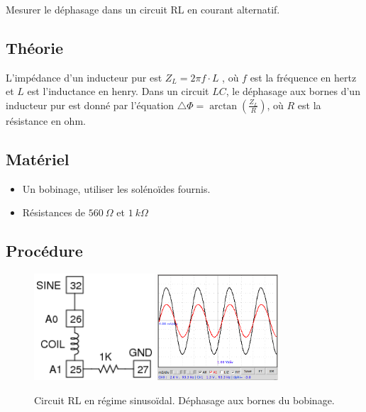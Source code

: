 \documentclass{book}
\begin{document}
Mesurer le déphasage dans un circuit RL en courant alternatif.

\subsection{Théorie}


L'impédance d'un inducteur pur est $Z_{L}=2\pi f\cdot L$  , où $f$  est la fréquence en hertz et $L$ est l'inductance en henry. Dans un circuit $LC$, le déphasage aux bornes d'un inducteur pur est donné par l'équation $\triangle\Phi=\arctan\left(\frac{Z_{L} }{R}\right)$, où $R$ est la résistance en ohm.

\subsection{Matériel}


\begin{itemize}
  \item Un bobinage, utiliser les solénoïdes fournis.
  \item Résistances de $560\ \Omega$  et $1\ k\Omega$
\end{itemize}

\subsection{Procédure}


\begin{figure}[h!]
\begin{center}
\caption{\label{fig:LR  phaseshift-screen}Circuit RL en régime sinusoïdal. Déphasage aux bornes du bobinage. }\vspace{0.5em}
\includegraphics[width=0.4\textwidth, height=0.3\textwidth, keepaspectratio]{Schematic-rl-steadystate.png}
\includegraphics[width=0.4\textwidth, height=0.3\textwidth, keepaspectratio]{Pic-LRphaseshift-125mH-125ohm.png}
\end{center}
\end{figure}
\end{document}
